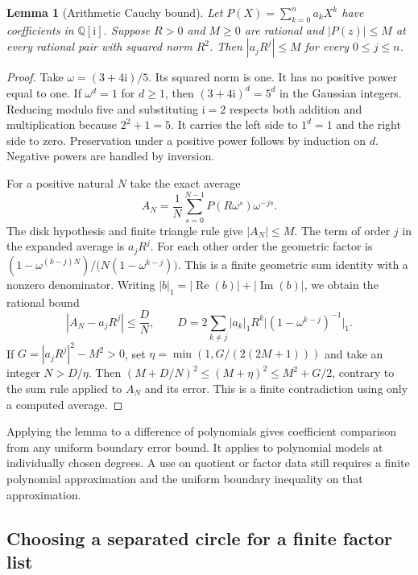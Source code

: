\documentclass[11pt]{amsart}
\newtheorem{lemma}[theorem]{Lemma}
\theoremstyle{definition}
\theoremstyle{remark}
\numberwithin{equation}{section}
\newcommand{\QQi}{\mathbb Q[\mathrm i]}
\newcommand{\re}{\operatorname{Re}}
\newcommand{\im}{\operatorname{Im}}
\begin{document}
\begin{lemma}[Arithmetic Cauchy bound]\label{lem:finite-cauchy}
Let $P(X)=\sum_{k=0}^n a_kX^k$ have coefficients in $\QQi$.
Suppose $R>0$ and $M\ge0$ are rational and
$|P(z)|\le M$ at every rational pair with squared norm $R^2$.
Then $|a_jR^j|\le M$ for every $0\le j\le n$.
\end{lemma}
\begin{proof}
Take $\omega=(3+4\mathrm i)/5$. Its squared norm is one.
It has no positive power equal to one. If $\omega^d=1$
for $d\ge1$, then $(3+4\mathrm i)^d=5^d$ in the Gaussian
integers. Reducing modulo five and substituting $\mathrm i=2$
respects both addition and multiplication because $2^2+1=5$.
It carries the left side to $1^d=1$ and the right side to zero.
Preservation under a positive power follows by induction on $d$.
Negative powers are handled by inversion.

For a positive natural $N$ take the exact average
\[
 A_N=\frac1N\sum_{s=0}^{N-1} P(R\omega^s)\omega^{-js}.
\]
The disk hypothesis and finite triangle rule give $|A_N|\le M$.
The term of order $j$ in the expanded average is $a_jR^j$.
For each other order the geometric factor is
$(1-\omega^{(k-j)N})/\bigl(N(1-\omega^{k-j})\bigr)$.
This is a finite geometric sum identity with a nonzero denominator.
Writing $|b|_1=|\re(b)|+|\im(b)|$, we obtain the rational bound
\[
 |A_N-a_jR^j|\le \frac{D}{N},
 \qquad
 D=2\sum_{k\ne j}|a_k|_1 R^k
               \bigl|(1-\omega^{k-j})^{-1}\bigr|_1 .
\]
If $G=|a_jR^j|^2-M^2>0$, set
$\eta=\min(1,G/(2(2M+1)))$ and take an integer $N>D/\eta$.
Then $(M+D/N)^2\le(M+\eta)^2\le M^2+G/2$,
contrary to the sum rule applied to $A_N$ and its error.
This is a finite contradiction using only a computed average.
\end{proof}

Applying the lemma to a difference of polynomials gives coefficient
comparison from any uniform boundary error bound. It applies to
polynomial models at individually chosen degrees. A use on quotient
or factor data still requires a finite polynomial approximation and
the uniform boundary inequality on that approximation.

\subsection{Choosing a separated circle for a finite factor list}
\end{document}
